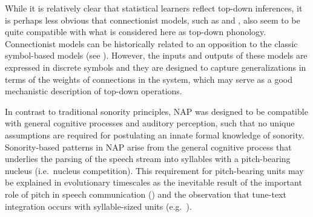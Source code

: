 While it is relatively clear that statistical learners reflect top-down inferences, it is perhaps less obvious that connectionist models, such as \citet{goldsmith1992local, laks1995connectionistsk,smolensky2014optimization} and \citet{tupper2012sonoritysk}, also seem to be quite compatible with what is considered here as top-down phonology.
Connectionist models can be historically related to an opposition to the classic symbol-based models (see ). However, the inputs and outputs of these models are expressed in discrete symbols and they are designed to capture generalizations in terms of the weights of connections in the system, which may serve as a good mechanistic description of top-down operations. 

In contrast to traditional sonority principles, NAP was designed to be compatible with general cognitive processes and auditory perception, such that no unique assumptions are required for postulating an innate formal knowledge of sonority.
Sonority-based patterns in NAP arise from the general cognitive process that underlies the parsing of the speech stream into syllables with a pitch-bearing nucleus (i.e.~nucleus competition). This requirement for pitch-bearing units may be explained in evolutionary timescales
as the inevitable result of the important role of pitch in speech communication (\citealt{bolinger1978intonation, cutler1997prosody, house1990tonal, roettger2019tune}) and the observation that tune-text integration occurs with syllable-sized units (e.g.~\citealt{goldsmith1976autosegmental, ladd2008intonational, liberman1975intonationalsk, pierrehumbert1980phoneticssk}).

